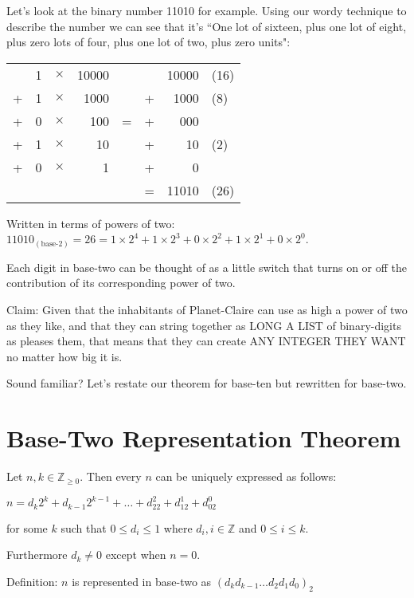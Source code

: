 \documentclass{article}
\newenvironment{jprIn}{\begin{adjustwidth}{2em}{}}{\end{adjustwidth}}
\begin{document}
Let's look at the binary number 11010 for example.
Using our wordy technique to describe the number
we can see that it's ``One lot of sixteen,
plus one lot of eight, plus zero lots of four,
plus one lot of two, plus zero units": 
\begin{center}
\begin{tabular}{r r r r c r r l}
\phantom & 1 & $\times$ & 10000 & \phantom & \phantom & 10000 & (16)\\
+ & 1 & $\times$ & 1000 & \phantom & + & 1000 & (8)\\
+ & 0 & $\times$ & 100 & \; \; = \; \; & + & 000 & \\
+ & 1 & $\times$ & 10 & \phantom & + & 10 & (2)\\
+ & 0 & $\times$ & 1 & \phantom & + & 0\\
\cline{6-8}
\phantom & \phantom & \phantom & \phantom & \phantom & = & 11010 & (26)\\
\end{tabular}
\end{center}
Written in terms of powers of two: $11010_{(\text{base-2})}=26=1\times2^4+1\times2^3+0\times2^2+1\times2^1+0\times2^0$.

Each digit in base-two can be thought of as a little switch that
turns on or off the contribution of its corresponding power of two.

Claim: Given that the inhabitants of Planet-Claire can use as high a power of two as they like,
and that they can string together as LONG A LIST of binary-digits as pleases them,
that means that they can create ANY INTEGER THEY WANT no matter how big it is.

Sound familiar? Let's restate our theorem for base-ten but rewritten for base-two.

\section*{Base-Two Representation Theorem}

\begin{jprIn}
Let $n,k\in \mathbb{Z}_{\ge 0}$. Then every $n$ can be uniquely expressed as follows:

\hspace{3em}$n=d_k2^k+d_{k-1}2^{k-1}+\dots+d_22^2+d_12^1+d_02^0$

for some $k$ such that $0 \le d_i \le 1$ where $d_i,i\in\mathbb{Z}$ and $0 \le i \le k$.

Furthermore $d_k\ne0$ except when $n=0$.

Definition: $n$ is represented in base-two as $(d_kd_{k-1}\dots{}d_2d_1d_0)_2$
\end{jprIn}
\bigskip
\end{document}
